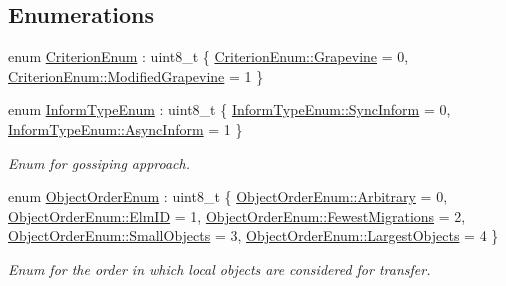 \subsection*{Enumerations}
\begin{DoxyCompactItemize}
\item 
enum \hyperlink{namespacevt_1_1vrt_1_1collection_1_1lb_a4e454750e102cf5404d5ac151148951c}{Criterion\+Enum} \+: uint8\+\_\+t \{ \hyperlink{namespacevt_1_1vrt_1_1collection_1_1lb_a4e454750e102cf5404d5ac151148951caa779a9fcc319cb370da5dc3a2b608721}{Criterion\+Enum\+::\+Grapevine} = 0, 
\hyperlink{namespacevt_1_1vrt_1_1collection_1_1lb_a4e454750e102cf5404d5ac151148951caf2d66de88187d7c4c75884f5605ae168}{Criterion\+Enum\+::\+Modified\+Grapevine} = 1
 \}
\item 
enum \hyperlink{namespacevt_1_1vrt_1_1collection_1_1lb_a38645ae954fc9b85e4c8f020eb0234aa}{Inform\+Type\+Enum} \+: uint8\+\_\+t \{ \hyperlink{namespacevt_1_1vrt_1_1collection_1_1lb_a38645ae954fc9b85e4c8f020eb0234aaa7228d42ce6e32b9d69a58878e39ecfa5}{Inform\+Type\+Enum\+::\+Sync\+Inform} = 0, 
\hyperlink{namespacevt_1_1vrt_1_1collection_1_1lb_a38645ae954fc9b85e4c8f020eb0234aaa1997a66729a2620d0bccf74d06bc402a}{Inform\+Type\+Enum\+::\+Async\+Inform} = 1
 \}\begin{DoxyCompactList}\small\item\em Enum for gossiping approach. \end{DoxyCompactList}
\item 
enum \hyperlink{namespacevt_1_1vrt_1_1collection_1_1lb_a3c71e131f84e2ccbb95f43a1058c749c}{Object\+Order\+Enum} \+: uint8\+\_\+t \{ \newline
\hyperlink{namespacevt_1_1vrt_1_1collection_1_1lb_a3c71e131f84e2ccbb95f43a1058c749ca3c1fc46575f79b15fc8990642387d07f}{Object\+Order\+Enum\+::\+Arbitrary} = 0, 
\hyperlink{namespacevt_1_1vrt_1_1collection_1_1lb_a3c71e131f84e2ccbb95f43a1058c749ca63d0a624ca97347ebbc3f4190b343888}{Object\+Order\+Enum\+::\+Elm\+ID} = 1, 
\hyperlink{namespacevt_1_1vrt_1_1collection_1_1lb_a3c71e131f84e2ccbb95f43a1058c749ca37b06ef260760bd7b343b29b8fb43063}{Object\+Order\+Enum\+::\+Fewest\+Migrations} = 2, 
\hyperlink{namespacevt_1_1vrt_1_1collection_1_1lb_a3c71e131f84e2ccbb95f43a1058c749caba285d85de6643804425ac332bf81193}{Object\+Order\+Enum\+::\+Small\+Objects} = 3, 
\newline
\hyperlink{namespacevt_1_1vrt_1_1collection_1_1lb_a3c71e131f84e2ccbb95f43a1058c749ca58a14656ff3b03b4af0559d79b5ac566}{Object\+Order\+Enum\+::\+Largest\+Objects} = 4
 \}\begin{DoxyCompactList}\small\item\em Enum for the order in which local objects are considered for transfer. \end{DoxyCompactList}

\end{DoxyCompactItemize}
